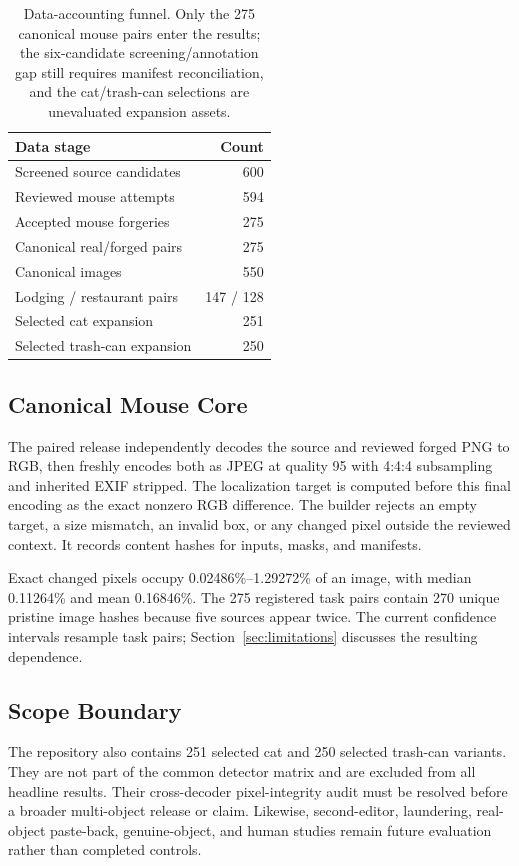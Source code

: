 \begin{table}[t]
\centering
\small
\begin{tabular}{lr}
\toprule
Data stage & Count \\
\midrule
Screened source candidates & 600 \\
Reviewed mouse attempts & 594 \\
Accepted mouse forgeries & 275 \\
Canonical real/forged pairs & 275 \\
Canonical images & 550 \\
Lodging / restaurant pairs & 147 / 128 \\
Selected cat expansion & 251 \\
Selected trash-can expansion & 250 \\
\bottomrule
\end{tabular}
\caption{Data-accounting funnel. Only the 275 canonical mouse pairs enter the results; the six-candidate screening/annotation gap still requires manifest reconciliation, and the cat/trash-can selections are unevaluated expansion assets.}
\label{tab:data-funnel}
\end{table}

\subsection{Canonical Mouse Core}

The paired release independently decodes the source and reviewed forged PNG to RGB, then freshly encodes both as JPEG at quality 95 with 4:4:4 subsampling and inherited EXIF stripped. The localization target is computed before this final encoding as the exact nonzero RGB difference. The builder rejects an empty target, a size mismatch, an invalid box, or any changed pixel outside the reviewed context. It records content hashes for inputs, masks, and manifests.

Exact changed pixels occupy 0.02486\%--1.29272\% of an image, with median 0.11264\% and mean 0.16846\%. The 275 registered task pairs contain 270 unique pristine image hashes because five sources appear twice. The current confidence intervals resample task pairs; Section~\ref{sec:limitations} discusses the resulting dependence.

\subsection{Scope Boundary}

The repository also contains 251 selected cat and 250 selected trash-can variants. They are not part of the common detector matrix and are excluded from all headline results. Their cross-decoder pixel-integrity audit must be resolved before a broader multi-object release or claim. Likewise, second-editor, laundering, real-object paste-back, genuine-object, and human studies remain future evaluation rather than completed controls.



